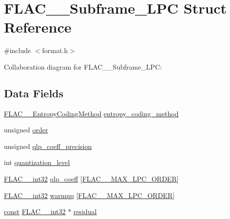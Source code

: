 \hypertarget{struct_f_l_a_c_____subframe___l_p_c}{}\section{F\+L\+A\+C\+\_\+\+\_\+\+Subframe\+\_\+\+L\+PC Struct Reference}
\label{struct_f_l_a_c_____subframe___l_p_c}


{\ttfamily \#include $<$format.\+h$>$}



Collaboration diagram for F\+L\+A\+C\+\_\+\+\_\+\+Subframe\+\_\+\+L\+PC\+:
\subsection*{Data Fields}
\begin{DoxyCompactItemize}
\item 
\hyperlink{struct_f_l_a_c_____entropy_coding_method}{F\+L\+A\+C\+\_\+\+\_\+\+Entropy\+Coding\+Method} \hyperlink{struct_f_l_a_c_____subframe___l_p_c_adb1401b2f8af05132420145a99f68c6e}{entropy\+\_\+coding\+\_\+method}
\item 
unsigned \hyperlink{struct_f_l_a_c_____subframe___l_p_c_a0de317accaf8a9f86194f97c378b2f86}{order}
\item 
unsigned \hyperlink{struct_f_l_a_c_____subframe___l_p_c_a6123b031203f603eba966b95fd2ad855}{qlp\+\_\+coeff\+\_\+precision}
\item 
int \hyperlink{struct_f_l_a_c_____subframe___l_p_c_aedcf1a3e5e62485e7ce250eda1f3e588}{quantization\+\_\+level}
\item 
\hyperlink{ordinals_8h_a33fd77bfe6d685541a0c034a75deccdc}{F\+L\+A\+C\+\_\+\+\_\+int32} \hyperlink{struct_f_l_a_c_____subframe___l_p_c_ad0b37ee925e2124a37fe3a513d5410b8}{qlp\+\_\+coeff} \mbox{[}\hyperlink{group__flac__format_ga16108d413f524329f338cff6e05f3aff}{F\+L\+A\+C\+\_\+\+\_\+\+M\+A\+X\+\_\+\+L\+P\+C\+\_\+\+O\+R\+D\+ER}\mbox{]}
\item 
\hyperlink{ordinals_8h_a33fd77bfe6d685541a0c034a75deccdc}{F\+L\+A\+C\+\_\+\+\_\+int32} \hyperlink{struct_f_l_a_c_____subframe___l_p_c_a91c6c71c6fc2b812da1d2a3761e29807}{warmup} \mbox{[}\hyperlink{group__flac__format_ga16108d413f524329f338cff6e05f3aff}{F\+L\+A\+C\+\_\+\+\_\+\+M\+A\+X\+\_\+\+L\+P\+C\+\_\+\+O\+R\+D\+ER}\mbox{]}
\item 
\hyperlink{zconf_8h_a2c212835823e3c54a8ab6d95c652660e}{const} \hyperlink{ordinals_8h_a33fd77bfe6d685541a0c034a75deccdc}{F\+L\+A\+C\+\_\+\+\_\+int32} $\ast$ \hyperlink{struct_f_l_a_c_____subframe___l_p_c_acae4d0d439ea8900c5771eb967aec9bf}{residual}
\end{DoxyCompactItemize}


